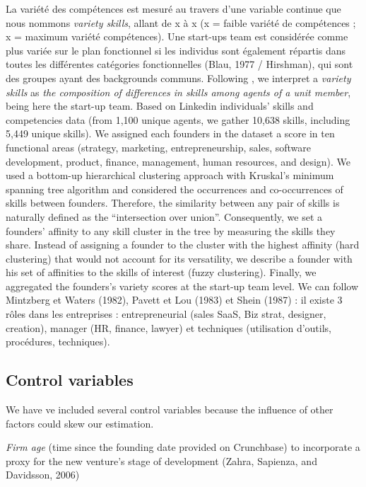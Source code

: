 \documentclass[12pt]{article}
\begin{document}
La variété des compétences est mesuré au travers d'une variable continue que nous nommons \textit{variety skills}, allant de x à x (x = faible variété de compétences ; x = maximum variété compétences). Une start-ups team est considérée comme plus variée sur le plan fonctionnel si les individus sont également répartis dans toutes les différentes catégories fonctionnelles (Blau, 1977 / Hirshman), qui sont des groupes ayant des backgrounds communs. Following \citet{harrison2007s}, we interpret a \textit{variety skills} as \textit{the composition of differences in skills among agents of a unit member}, being here the start-up team. Based on Linkedin individuals' skills and competencies data (from 1,100 unique agents, we gather 10,638 skills, including 5,449 unique skills). We assigned each founders in the dataset a score in ten functional areas (strategy, marketing, entrepreneurship, sales, software development, product, finance, management, human resources, and design). We used a bottom-up hierarchical clustering approach with Kruskal's minimum spanning tree algorithm \citep{kruskal1956shortest} and considered the occurrences and co-occurrences of skills between founders. Therefore, the similarity between any pair of skills is naturally defined as the “intersection over union”. Consequently, we set a founders' affinity to any skill cluster in the tree by measuring the skills they share. Instead of assigning a founder to the cluster with the highest affinity (hard clustering) that would not account for its versatility, we describe a founder with his set of affinities to the skills of interest (fuzzy clustering). Finally, we aggregated the founders's variety scores at the start-up team level. We can follow Mintzberg et Waters (1982), Pavett et Lou (1983) et Shein (1987) : il existe 3 rôles dans les entreprises : entrepreneurial (sales SaaS, Biz strat, designer, creation), manager (HR, finance, lawyer) et techniques (utilisation d'outils, procédures, techniques).

\subsection{Control variables}

We have ve included several control variables because the influence of other factors could skew our estimation.

\textit{Firm age} (time since the founding date provided on Crunchbase) to incorporate a proxy for the new venture's stage of development (Zahra, Sapienza, and Davidsson, 2006)
\end{document}
